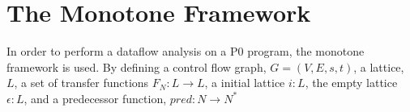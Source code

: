 \section{The Monotone Framework}
In order to perform a dataflow analysis on a P0 program, the monotone framework is used. By defining a control flow graph, $G = (V, E, s,t)$, a lattice, $L$, a set of transfer functions $F_N : L \rightarrow L$, a initial lattice $i : L$, the empty lattice $\epsilon : L$, and a predecessor function, $pred : N \rightarrow N^*$

